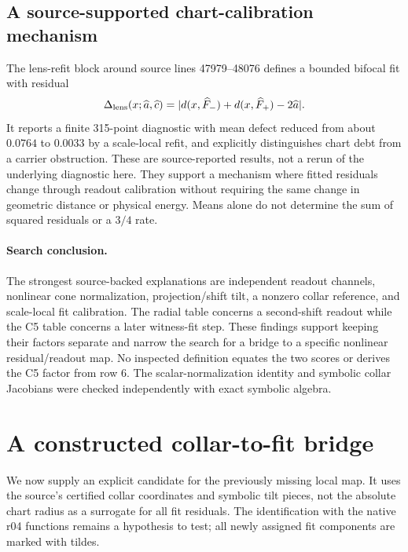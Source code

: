 \documentclass[11pt,a4paper]{article}
\begin{document}
\subsection{A source-supported chart-calibration mechanism}
The lens-refit block around source lines 47979--48076 defines a bounded
bifocal fit with residual
\[
\Delta_{\rm lens}(x;\widehat a,\widehat c)
=|d(x,\widehat F_-)+d(x,\widehat F_+)-2\widehat a|.
\]
It reports a finite 315-point diagnostic with mean defect reduced from
about $0.0764$ to $0.0033$ by a scale-local refit, and explicitly distinguishes
chart debt from a carrier obstruction. These are source-reported results,
not a rerun of the underlying diagnostic here. They support a mechanism
where fitted residuals change through readout calibration without requiring
the same change in geometric distance or physical energy. Means alone do
not determine the sum of squared residuals or a $3/4$ rate.

\paragraph{Search conclusion.}
The strongest source-backed explanations are independent readout channels,
nonlinear cone normalization, projection/shift tilt, a nonzero collar
reference, and scale-local fit calibration. The radial table concerns a
second-shift readout while the C5 table concerns a later witness-fit step.
These findings support keeping their factors separate and narrow the search
for a bridge to a specific nonlinear residual/readout map. No inspected
definition equates the two scores or derives the C5 factor from row 6.
The scalar-normalization identity and symbolic collar Jacobians were checked
independently with exact symbolic algebra.

\section{A constructed collar-to-fit bridge}
\label{sec:constructed-collar-fit-bridge}
We now supply an explicit candidate for the previously missing local map.
It uses the source's certified collar coordinates and symbolic tilt pieces,
not the absolute chart radius as a surrogate for all fit residuals. The
identification with the native r04 functions remains a hypothesis to test;
all newly assigned fit components are marked with tildes.
\end{document}
